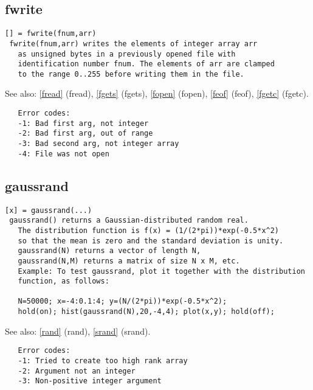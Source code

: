 \documentclass[a4paper]{article}
\begin{document}
\subsection{fwrite\label{fwrite}}

\begin{tscreen}
\begin{verbatim}
[] = fwrite(fnum,arr)
 fwrite(fnum,arr) writes the elements of integer array arr
   as unsigned bytes in a previously opened file with
   identification number fnum. The elements of arr are clamped
   to the range 0..255 before writing them in the file.
\end{verbatim}

See also: \ref{fread} {(fread)}, \ref{fgets} {(fgets)}, \ref{fopen} {(fopen)}, \ref{feof} {(feof)}, \ref{fgetc} {(fgetc)}.
\begin{verbatim}
   Error codes:
   -1: Bad first arg, not integer
   -2: Bad first arg, out of range
   -3: Bad second arg, not integer array
   -4: File was not open
\end{verbatim}
\end{tscreen}





\subsection{gaussrand\label{gaussrand}}

\begin{tscreen}
\begin{verbatim}
[x] = gaussrand(...)
 gaussrand() returns a Gaussian-distributed random real.
   The distribution function is f(x) = (1/(2*pi))*exp(-0.5*x^2)
   so that the mean is zero and the standard deviation is unity.
   gaussrand(N) returns a vector of length N,
   gaussrand(N,M) returns a matrix of size N x M, etc.
   Example: To test gaussrand, plot it together with the distribution
   function, as follows:

   N=50000; x=-4:0.1:4; y=(N/(2*pi))*exp(-0.5*x^2);
   hold(on); hist(gaussrand(N),20,-4,4); plot(x,y); hold(off);
\end{verbatim}

See also: \ref{rand} {(rand)}, \ref{srand} {(srand)}.
\begin{verbatim}
   Error codes:
   -1: Tried to create too high rank array
   -2: Argument not an integer
   -3: Non-positive integer argument
\end{verbatim}
\end{tscreen}
\end{document}
